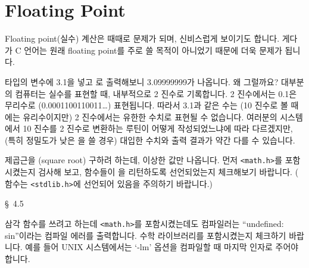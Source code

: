 \chapter{Floating Point}	\label{chap:float}

Floating point(실수) 계산은 때때로 문제가 되며, 신비스럽게 보이기도 합니다.
게다가 C 언어는 원래 floating point를 주로 쓸 목적이 아니었기 때문에 더욱
문제가 됩니다.


\begin{faq}
	 타입의 변수에 3.1을 넣고 로 출력해보니
	3.09999999가 나옵니다.  왜 그럴까요?
\A
	대부분의 컴퓨터는 실수를 표현할 때, 내부적으로 2 진수로 기록합니다.
	2 진수에서는 0.1은 무리수로 (0.0001100110011\ldots)
	표현됩니다.  따라서 3.1과 같은 수는 (10 진수로 볼 때에는 유리수이지만)
	2 진수에서는 유한한 수치로 표현될 수 없습니다.  여러분의 시스템에서
	10 진수를 2 진수로 변환하는 루틴이 어떻게 작성되었느냐에 따라
	다르겠지만, (특히 정밀도가 낮은 을 쓸 경우) 대입한 수치와
	출력 결과가 약간 다를 수 있습니다.  
\end{faq}

\begin{faq}
	제곱근을 (square root) 구하려 하는데, 이상한 값만 나옵니다.
\A
	먼저 \verb+<math.h>+를 포함시켰는지 검사해 보고, 함수들이
	을 리턴하도록 선언되었는지 체크해보기 바랍니다.
	( 함수는 \verb+<stdlib.h>+에 선언되어 있음을 주의하기
	바랍니다.) 

\R
	\cite{ctp} \S\ 4.5 
\end{faq}

\begin{faq}
	삼각 함수를 쓰려고 하는데 \verb+<math.h>+를 포함시켰는데도
	컴파일러는 ``undefined: sin''이라는 컴파일 에러를 출력합니다.
\A
	수학 라이브러리를 포함시켰는지 체크하기 바랍니다.
	예를 들어 UNIX 시스템에서는 `-lm' 옵션을 컴파일할 때 마지막 인자로
	주어야 합니다.  
\end{faq}

